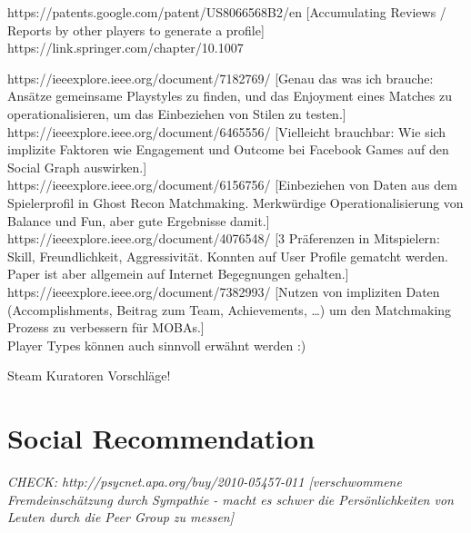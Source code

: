 \documentclass[nochapterpage,bigchapter,linedtoc,longdoc,colorback,accentcolor=tud3b,oneside]{tudreport}
\begin{document}
https://patents.google.com/patent/US8066568B2/en [Accumulating Reviews / Reports by other players to generate a profile]\\

https://link.springer.com/chapter/10.1007%

https://ieeexplore.ieee.org/document/7182769/ [Genau das was ich brauche: Ansätze gemeinsame Playstyles zu finden, und das Enjoyment eines Matches zu operationalisieren, um das Einbeziehen von Stilen zu testen.] \cite{wang2015thinking}\\

https://ieeexplore.ieee.org/document/6465556/ [Vielleicht brauchbar: Wie sich implizite Faktoren wie Engagement und Outcome bei Facebook Games auf den Social Graph auswirken.]\\

https://ieeexplore.ieee.org/document/6156756/ [Einbeziehen von Daten aus dem Spielerprofil in Ghost Recon Matchmaking. Merkwürdige Operationalisierung von Balance und Fun, aber gute Ergebnisse damit.] \cite{delalleau2012beyond}\\

https://ieeexplore.ieee.org/document/4076548/ [3 Präferenzen in Mitspielern: Skill, Freundlichkeit, Aggressivität. Konnten auf User Profile gematcht werden. Paper ist aber allgemein auf Internet Begegnungen gehalten.] \cite{riegelsberger2007personality}\\

https://ieeexplore.ieee.org/document/7382993/ [Nutzen von impliziten Daten (Accomplishments, Beitrag zum Team, Achievements, …) um den Matchmaking Prozess zu verbessern für MOBAs.] \cite{suznjevic2015application}\\

Player Types können auch sinnvoll erwähnt werden :)

Steam Kuratoren Vorschläge! 

\section{Social Recommendation}

\textit{CHECK: http://psycnet.apa.org/buy/2010-05457-011 [verschwommene Fremdeinschätzung durch Sympathie - macht es schwer die Persönlichkeiten von Leuten durch die Peer Group zu messen] \cite{leising2010letter}}\\
\end{document}

